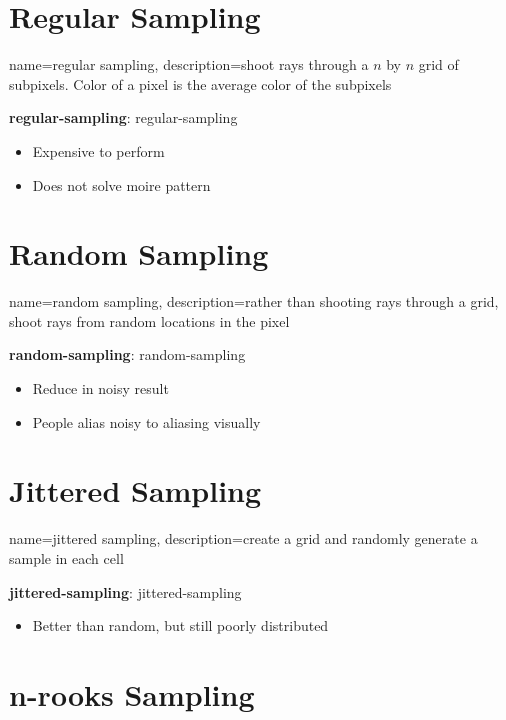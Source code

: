 \section{Regular Sampling}

  {
    name=regular sampling,
    description={shoot rays through a $ n $ by $ n $ grid of subpixels.
    Color of a pixel is the average color of the subpixels}
  }

  \textbf{\Gls{regular-sampling}}: \glsdesc{regular-sampling}

  \begin{itemize}
    \item Expensive to perform
    \item Does not solve moire pattern
  \end{itemize}

\section{Random Sampling}

  {
    name=random sampling,
    description={rather than shooting rays through a grid, shoot rays from
    random locations in the pixel}
  }

  \textbf{\Gls{random-sampling}}: \glsdesc{random-sampling}

  \begin{itemize}
    \item Reduce in noisy result
    \item People alias noisy to aliasing visually
  \end{itemize}

\section{Jittered Sampling}

  {
    name=jittered sampling,
    description={create a grid and randomly generate a sample in each cell}
  }

  \textbf{\Gls{jittered-sampling}}: \glsdesc{jittered-sampling}

  \begin{itemize}
    \item Better than random, but still poorly distributed
  \end{itemize}

\section{n-rooks Sampling}


